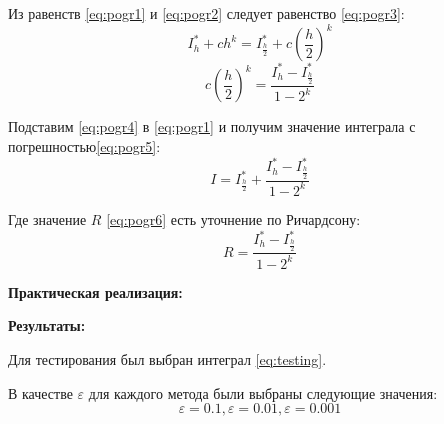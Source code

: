\documentclass[a4paper, 12pt]{article}   	%
\begin{document}
Из равенств \eqref{eq:pogr1} и \eqref{eq:pogr2} следует равенство \eqref{eq:pogr3}:
\begin{equation}\label{eq:pogr3}
I^*_h + ch^k = I^*_\frac{h}{2} + c{(\frac{h}{2})}^k
\end{equation}
\begin{equation}\label{eq:pogr4}
c{(\frac{h}{2})}^k = \frac{I^*_h - I^*_\frac{h}{2}}{1-2^k}
\end{equation}

Подставим \eqref{eq:pogr4} в \eqref{eq:pogr1} и получим значение интеграла с погрешностью\eqref{eq:pogr5}:
\begin{equation}\label{eq:pogr5}
I = I^*_\frac{h}{2} + \frac{I^*_h - I^*_\frac{h}{2}}{1-2^k}
\end{equation}

Где значение $R$ \eqref{eq:pogr6} есть уточнение по Ричардсону:
 \begin{equation}\label{eq:pogr6}
R = \frac{I^*_h - I^*_\frac{h}{2}}{1-2^k}
\end{equation}

\textbf{Практическая реализация:}
\hypertarget{lst:quad}{}



\textbf{Результаты:}

Для тестирования был выбран интеграл \eqref{eq:testing}.

В качестве $\varepsilon$ для каждого метода были выбраны следующие значения:
$$ \varepsilon = 0.1, \varepsilon = 0.01, \varepsilon = 0.001 $$
\end{document}
